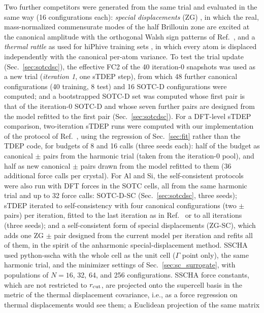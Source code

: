 \documentclass[aip,jap,reprint,amsmath,amssymb,floatfix]{revtex4-2}
\begin{document}
Two further competitors were generated from the same trial and evaluated in
the same way (16 configurations each): \textit{special displacements} (ZG)
\cite{ref42}, in which the real, mass-normalized commensurate modes of the
half Brillouin zone are excited at the canonical amplitude with the
orthogonal Walsh sign patterns of Ref.~, and a
\textit{thermal rattle} as used for hiPhive training sets \cite{ref59}, in
which every atom is displaced independently with the canonical per-atom
variance. To test the trial update (Sec.~\ref{sec:sotcdsc}), the effective FC2
of the 40 iteration-0 snapshots was used as a new trial (\textit{iteration
1}, one sTDEP step), from which 48 further canonical configurations (40
training, 8 test) and 16 SOTC-D configurations were computed; and a
bootstrapped SOTC-D set was computed whose first pair is that of the
iteration-0 SOTC-D and whose seven further pairs are designed from the model
refitted to the first pair (Sec.~\ref{sec:sotcdsc}). For a DFT-level sTDEP comparison, two-iteration sTDEP runs were computed
with our implementation of the protocol of Ref.~, using the
regression of Sec.~\ref{sec:fit} rather than the TDEP code, for budgets of 8 and 16 calls (three
seeds each): half of the budget as canonical $\pm$ pairs from the harmonic
trial (taken from the iteration-0 pool), and half as new canonical $\pm$
pairs drawn from the model refitted to them (36 additional force calls per
crystal). For Al and Si, the self-consistent protocols were also run with
DFT forces in the SOTC cells, all from the same harmonic trial and up to 32
force calls: SOTC-D-SC (Sec.~\ref{sec:sotcdsc}, three seeds); sTDEP iterated
to self-consistency with four canonical configurations (two $\pm$ pairs) per
iteration, fitted to the last iteration as in Ref.~ or to
all iterations (three seeds); and a self-consistent form of special
displacements (ZG-SC), which adds one ZG $\pm$ pair designed from the
current model per iteration and refits all of them, in the spirit of the
anharmonic special-displacement method. SSCHA used python-sscha
\cite{ref50} with the whole cell as the unit cell ($\Gamma$ point only), the
same harmonic trial, and the minimizer settings of
Sec.~\ref{sec:sc_surrogate}, with populations of $N=16$, 32, 64, and 256
configurations. SSCHA force constants, which are not restricted to $r_{\rm
cut}$, are projected onto the supercell basis in the metric of the thermal
displacement covariance, i.e., as a force regression on thermal
displacements would see them; a Euclidean projection of the same matrix
\end{document}
